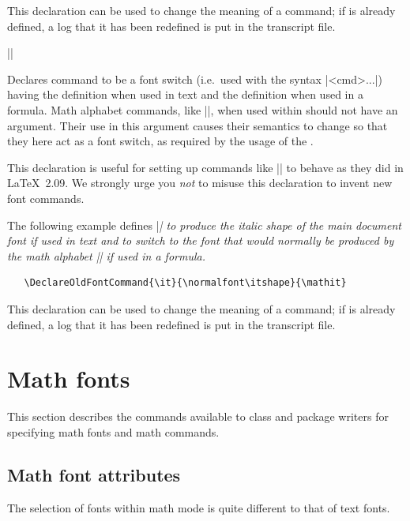 \documentclass{ltxguide}[1995/11/28]
\begin{document}
This declaration can be used to change the meaning of a command; if
 is already defined, a log that it has been redefined is put in
the transcript file.

\begin{decl}
  |\DeclareOldFontCommand|  
\end{decl}

Declares command  to be a font switch (i.e.~used with the
syntax |{<cmd>...}|) having the definition 
when used in text and the definition  when used in a
formula.
Math alphabet commands, like |\mathit|, when used within 
should not have an argument.  Their use in this argument causes their
semantics to change so that they here act as a font switch, as
required by the usage of the .

This declaration is useful for setting up commands like |\rm| to behave
as they did in \LaTeX~2.09. We strongly urge you \emph{not} to misuse
this declaration to invent new font commands.

\newpage

The following example defines |\it| to produce the italic shape of the
main document font if used in text and to switch to the font that would
normally be produced by the math alphabet |\mathit| if used in a
formula.
\begin{verbatim}
   \DeclareOldFontCommand{\it}{\normalfont\itshape}{\mathit}
\end{verbatim}

This declaration can be used to change the meaning of a command; if
 is already defined, a log that it has been redefined is put in
the transcript file.


\section{Math fonts}
\label{sec:math}

This section describes the commands available to class and package
writers for specifying math fonts and math commands.

\subsection{Math font attributes}

The selection of fonts within math mode is quite different to that of
text fonts.
\end{document}
